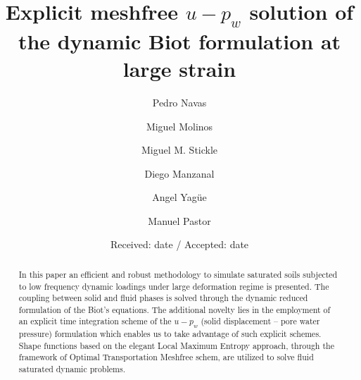 \documentclass[twocolumn]{svjour3}          %
\begin{document}
\title{Explicit meshfree $u-p_w$ solution of the dynamic Biot formulation at large strain%
}


\author{Pedro Navas       \and
        Miguel Molinos \and
        Miguel M. Stickle \and
        Diego Manzanal \and
        Angel Yag\"ue \and
        Manuel Pastor
}



\date{Received: date / Accepted: date}


\maketitle

\begin{abstract}
In this paper an efficient and robust methodology to simulate saturated soils subjected to low frequency dynamic loadings under large deformation regime is presented. The coupling between solid and fluid phases is solved through the dynamic reduced formulation of the Biot's equations. The additional novelty lies in the employment of an explicit time integration scheme of the $u-p_w$ (solid displacement -- pore water pressure) formulation which enables us to take advantage of such explicit schemes. Shape functions based on the elegant Local Maximum Entropy approach, through the framework of Optimal Transportation Meshfree schem, are utilized to solve fluid saturated dynamic problems.
\end{abstract}
\end{document}
